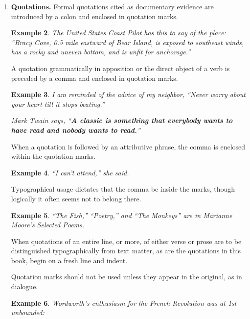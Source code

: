 \documentclass{article}
\newtheorem{example}{Example}
\begin{document}
\begin{enumerate}
	The expression within the marks is punctuated as if it stood by itself, except that the final stop is omitted unless it is question mark or an exclamation point.
	\begin{example}
		I went to her house yesterday (my 3rd attempt to see her), but she had left town.
		
		He declares (and why should we doubt his good faith?) that he is now certain of success.
	\end{example}
	(When a wholly detached expression or sentence is parenthesized, the final stop comes before the last mark of parenthesis.)
	\item {\bf Quotations.} Formal quotations cited as documentary evidence are introduced by a colon and enclosed in quotation marks.
	\begin{example}
		The United States Coast Pilot has this to say of the place: ``Bracy Cove, 0.5 mile eastward of Bear Island, is exposed to southeast winds, has a rocky and uneven bottom, and is unfit for anchorage.''
	\end{example}
	A quotation grammatically in apposition or the direct object of a verb is preceded by a comma and enclosed in quotation marks.
	\begin{example}
		I am reminded of the advice of my neighbor, ``Never worry about your heart till it stops beating.''
		
		Mark Twain says, ``{\bf A classic is something that everybody wants to have read and nobody wants to read.}''
	\end{example}
	When a quotation is followed by an attributive phrase, the comma is enclosed within the quotation marks.
	\begin{example}
		``I can't attend,'' she said.
	\end{example}
	Typographical usage dictates that the comma be inside the marks, though logically it often seems not to belong there.
	\begin{example}
		``The Fish,'' ``Poetry,'' and ``The Monkeys'' are in Marianne Moore's Selected Poems.
	\end{example}
	When quotations of an entire line, or more, of either verse or prose are to be distinguished typographically from text matter, as are the quotations in this book, begin on a fresh line and indent.
	
	Quotation marks should not be used unless they appear in the original, as in dialogue.
	\begin{example}
		Wordworth's enthusiasm for the French Revolution was at 1st unbounded:
		

\end{example}
\end{enumerate}
\end{document}
